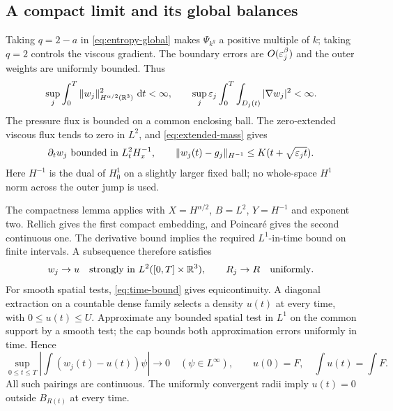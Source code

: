 \subsection{A compact limit and its global balances}

Taking $q=2-a$ in \eqref{eq:entropy-global} makes
$\Psi_{k^q}$ a positive multiple of $k$; taking $q=2$ controls the
viscous gradient. The boundary errors are $O(\varepsilon_j^\beta)$ and the
outer weights are uniformly bounded. Thus
\begin{equation}\label{eq:compactness-bounds}
 \sup_j\int_0^T\|w_j\|_{H^{\alpha/2}(\mathbb R^3)}^2\,\,\mathrm d t<\infty,
 \qquad \sup_j\varepsilon_j\int_0^T\int_{D_j(t)}|\nabla w_j|^2<\infty.
\end{equation}
The pressure flux is bounded on a common enclosing ball. The zero-extended
viscous flux tends to zero in $L^2$, and \eqref{eq:extended-mass} gives
\begin{equation}\label{eq:time-bound}
 \partial_tw_j\ \hbox{bounded in }L^2_tH^{-1}_x,
 \qquad \|w_j(t)-g_j\|_{H^{-1}}\leq K(t+\sqrt{\varepsilon_jt}).
\end{equation}
Here $H^{-1}$ is the dual of $H^1_0$ on a slightly larger fixed ball;
no whole-space $H^1$ norm across the outer jump is used.

The compactness lemma \cite[Lemma~7.5]{Stan2016} applies with
$X=H^{\alpha/2}$, $B=L^2$, $Y=H^{-1}$ and exponent two. Rellich gives
the first compact embedding, and Poincar\'e gives the second continuous
one. The derivative bound implies the required $L^1$-in-time bound on
finite intervals. A subsequence therefore satisfies
\begin{equation}\label{eq:limit-convergence}
 w_j\to u\quad\hbox{strongly in }L^2([0,T]\times\mathbb R^3),
 \qquad R_j\to R\quad\hbox{uniformly}.
\end{equation}
For smooth spatial tests, \eqref{eq:time-bound} gives equicontinuity.
A diagonal extraction on a countable dense family selects a density
$u(t)$ at every time, with $0\leq u(t)\leq U$. Approximate any bounded
spatial test in $L^1$ on the common support by a smooth test; the cap
bounds both approximation errors uniformly in time. Hence
\begin{equation}\label{eq:weak-time}
 \sup_{0\leq t\leq T}\left|\int(w_j(t)-u(t))\psi\right|\to0
 \quad(\psi\in L^\infty),\qquad
 u(0)=F,\quad \int u(t)=\int F.
\end{equation}
All such pairings are continuous. The uniformly convergent radii imply
$u(t)=0$ outside $B_{R(t)}$ at every time.

